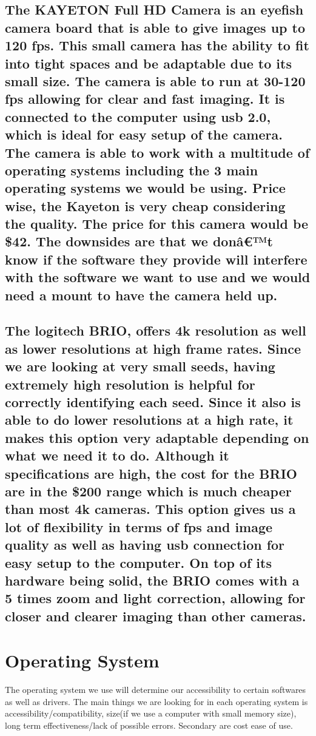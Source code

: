 \documentclass[10pt, letterpaper, twoside, draftclsnofoot, onecolumn. notitlepage]{article}
\begin{document}
\subsection{The KAYETON Full HD Camera is an eyefish camera board that is able to give images up to 120 fps. This small camera has the ability to fit into tight spaces and be adaptable due to its small size. The camera is able to run at 30-120 fps allowing for clear and fast imaging. It is connected to the computer using usb 2.0, which is ideal for easy setup of the camera. The camera is able to work with a multitude of operating systems including the 3 main operating systems we would be using. Price wise, the Kayeton is very cheap considering the quality. The price for this camera would be \$42. The downsides are that we donâ€™t know if the software they provide will interfere with the software we want to use and we would need a mount to have the camera held up.}

\subsection{The logitech BRIO, offers 4k resolution as well as lower resolutions at high frame rates. Since we are looking at very small seeds, having extremely high resolution is helpful for correctly identifying each seed. Since it also is able to do lower resolutions at a high rate, it makes this option very adaptable depending on what we need it to do. Although it specifications are high, the cost for the BRIO are in the \$200 range which is much cheaper than most 4k cameras. This option gives us a lot of flexibility in terms of fps and image quality as well as having usb connection for easy setup to the computer. On top of its hardware being solid, the BRIO comes with a 5 times zoom and light correction, allowing for closer and clearer imaging than other cameras.} 

\section{Operating System}
\quad 
The operating system we use will determine our accessibility to certain softwares as well as drivers. The main things we are looking for in each operating system is accessibility/compatibility, size(if we use a computer with small memory size), long term effectiveness/lack of possible errors. Secondary are cost ease of use. 
\end{document}
